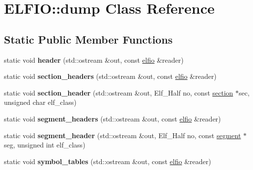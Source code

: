 \hypertarget{class_e_l_f_i_o_1_1dump}{}\section{E\+L\+F\+IO\+:\+:dump Class Reference}
\label{class_e_l_f_i_o_1_1dump}
\subsection*{Static Public Member Functions}
\begin{DoxyCompactItemize}
\item 
static void {\bfseries header} (std\+::ostream \&out, const \hyperlink{class_e_l_f_i_o_1_1elfio}{elfio} \&reader)\hypertarget{class_e_l_f_i_o_1_1dump_a16ee3f884fdff1bfd87d2513543b4d39}{}\label{class_e_l_f_i_o_1_1dump_a16ee3f884fdff1bfd87d2513543b4d39}

\item 
static void {\bfseries section\+\_\+headers} (std\+::ostream \&out, const \hyperlink{class_e_l_f_i_o_1_1elfio}{elfio} \&reader)\hypertarget{class_e_l_f_i_o_1_1dump_aee9c2e17dc9c709b78401f7a38a31c8e}{}\label{class_e_l_f_i_o_1_1dump_aee9c2e17dc9c709b78401f7a38a31c8e}

\item 
static void {\bfseries section\+\_\+header} (std\+::ostream \&out, Elf\+\_\+\+Half no, const \hyperlink{class_e_l_f_i_o_1_1section}{section} $\ast$sec, unsigned char elf\+\_\+class)\hypertarget{class_e_l_f_i_o_1_1dump_a5a8ef9b856de2e1b0447ee6a74fd98d9}{}\label{class_e_l_f_i_o_1_1dump_a5a8ef9b856de2e1b0447ee6a74fd98d9}

\item 
static void {\bfseries segment\+\_\+headers} (std\+::ostream \&out, const \hyperlink{class_e_l_f_i_o_1_1elfio}{elfio} \&reader)\hypertarget{class_e_l_f_i_o_1_1dump_ad1a6efd3db614d85b0c50a54451e696a}{}\label{class_e_l_f_i_o_1_1dump_ad1a6efd3db614d85b0c50a54451e696a}

\item 
static void {\bfseries segment\+\_\+header} (std\+::ostream \&out, Elf\+\_\+\+Half no, const \hyperlink{class_e_l_f_i_o_1_1segment}{segment} $\ast$seg, unsigned int elf\+\_\+class)\hypertarget{class_e_l_f_i_o_1_1dump_a3e837ae64e7c733dfd0d1bc004b53529}{}\label{class_e_l_f_i_o_1_1dump_a3e837ae64e7c733dfd0d1bc004b53529}

\item 
static void {\bfseries symbol\+\_\+tables} (std\+::ostream \&out, const \hyperlink{class_e_l_f_i_o_1_1elfio}{elfio} \&reader)\hypertarget{class_e_l_f_i_o_1_1dump_ac2fee2fccc29233d6839b39a84805637}{}\label{class_e_l_f_i_o_1_1dump_ac2fee2fccc29233d6839b39a84805637}


\end{DoxyCompactItemize}
